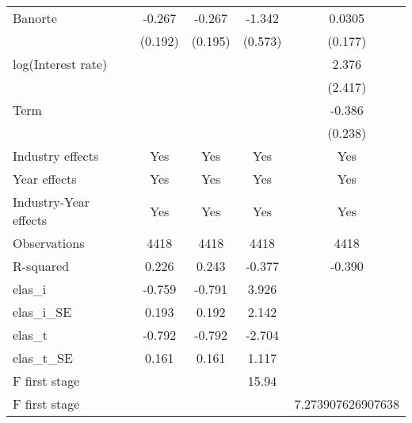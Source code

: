 {\begin{tabular}{l*{4}{c}}
Banorte         &   -0.267         &   -0.267         &   -1.342\sym{**} &   0.0305         \\
                &  (0.192)         &  (0.195)         &  (0.573)         &  (0.177)         \\
log(Interest rate)&                  &                  &                  &    2.376         \\
                &                  &                  &                  &  (2.417)         \\
Term            &                  &                  &                  &   -0.386         \\
                &                  &                  &                  &  (0.238)         \\
Industry effects &      Yes         &      Yes         &      Yes         &      Yes         \\
Year effects    &      Yes         &      Yes         &      Yes         &      Yes         \\
Industry-Year effects &      Yes         &      Yes         &      Yes         &      Yes         \\
\hline
Observations    &     4418         &     4418         &     4418         &     4418         \\
R-squared       &    0.226         &    0.243         &   -0.377         &   -0.390         \\
elas_i          &   -0.759         &   -0.791         &    3.926         &                  \\
elas_i_SE       &    0.193         &    0.192         &    2.142         &                  \\
elas_t          &   -0.792         &   -0.792         &   -2.704         &                  \\
elas_t_SE       &    0.161         &    0.161         &    1.117         &                  \\
F first stage   &                  &                  &    15.94         &                  \\
F first stage   &                  &                  &                  &7.273907626907638         \\
\hline\hline
\end{tabular}
}
